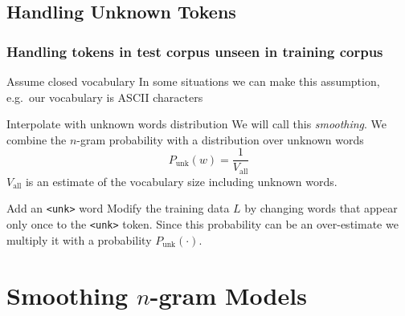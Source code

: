 \subsection{Handling Unknown Tokens}

\begin{frame}
\frametitle{Handling tokens in test corpus unseen in training corpus}
\begin{block}{Assume closed vocabulary}
In some situations we can make this assumption, e.g.\ our vocabulary is ASCII characters
\end{block}
\pause
\begin{block}{Interpolate with unknown words distribution}
We will call this {\em smoothing}. We combine the $n$-gram probability with a distribution over unknown words 
\smallskip
\[ P_{\textrm{unk}}(w) = \frac{1}{V_{\textrm{all}}} \] 
$V_{\textrm{all}}$ is an estimate of the vocabulary size including unknown words.
\end{block}
\pause
\begin{block}{Add an \texttt{<unk>} word}
Modify the training data $L$ by changing words that appear only once to the \texttt{<unk>} token. Since this probability can be an over-estimate we multiply it with a probability $P_{\textrm{unk}}(\cdot)$.
\end{block}

\end{frame}

\section{Smoothing $n$-gram Models}
\frame{\tableofcontents[currentsection]}


